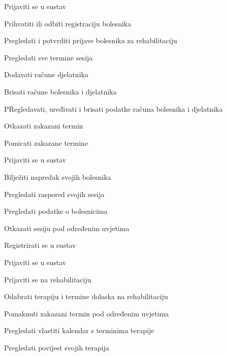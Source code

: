\begin{packed_enum}
	\item  {}

	\begin{packed_enum}

        \item Prijaviti se u sustav 
		\item Prihvatiti ili odbiti registraciju bolesnika
        \item Pregledati i potvrditi prijave bolesnika za rehabilitaciju
        \item Pregledati sve termine sesija
        \item Dodavati račune djelatnika
        \item Brisati račune bolesnika i djelatnika
        \item PRegledavati, uređivati i brisati podatke računa bolesnika i djelatnika
        \item Otkazati zakazani termin 
        \item Pomicati zakazane termine 

	\end{packed_enum}

	\item  {}

	\begin{packed_enum}

        \item Prijaviti se u sustav 
		\item Bilježiti napredak svojih bolesnika
		\item Pregledati raspored svojih sesija
		\item Pregledati podatke o bolesnicima
		\item Otkazati sesiju pod određenim uvjetima

	\end{packed_enum}

	\item {}

	\begin{packed_enum}

		\item Registrirati se u sustav
        \item Prijaviti se u sustav 
		\item Prijaviti se na rehabilitaciju
		\item Odabrati terapiju i termine dolaska na rehabilitaciju
		\item Pomaknuti zakazani termin pod određenim uvjetima
		\item Pregledati vlastiti kalendar s terminima terapije
		\item Pregledati povijest svojih terapija 
  


\end{packed_enum}
\end{packed_enum}
